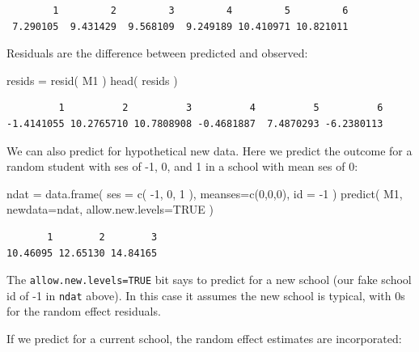 \documentclass[
  letterpaper,
  DIV=11,
  numbers=noendperiod]{scrreprt}
\newenvironment{Shaded}{\begin{snugshade}}{\end{snugshade}}
\newcommand{\AttributeTok}[1]{\textcolor[rgb]{0.49,0.56,0.16}{#1}}
\newcommand{\ConstantTok}[1]{\textcolor[rgb]{0.53,0.00,0.00}{#1}}
\newcommand{\DecValTok}[1]{\textcolor[rgb]{0.25,0.63,0.44}{#1}}
\newcommand{\FunctionTok}[1]{\textcolor[rgb]{0.02,0.16,0.49}{#1}}
\newcommand{\NormalTok}[1]{\textcolor[rgb]{0.00,0.44,0.13}{#1}}
\newcommand{\OtherTok}[1]{\textcolor[rgb]{0.00,0.44,0.13}{#1}}
\newcommand{\SpecialCharTok}[1]{\textcolor[rgb]{0.25,0.44,0.63}{#1}}
\begin{document}
\begin{verbatim}
        1         2         3         4         5         6 
 7.290105  9.431429  9.568109  9.249189 10.410971 10.821011 
\end{verbatim}

Residuals are the difference between predicted and observed:

\begin{Shaded}
\begin{Highlighting}[]
\NormalTok{resids }\OtherTok{=} \FunctionTok{resid}\NormalTok{( M1 )}
\FunctionTok{head}\NormalTok{( resids )}
\end{Highlighting}
\end{Shaded}

\begin{verbatim}
         1          2          3          4          5          6 
-1.4141055 10.2765710 10.7808908 -0.4681887  7.4870293 -6.2380113 
\end{verbatim}

We can also predict for hypothetical new data. Here we predict the
outcome for a random student with ses of -1, 0, and 1 in a school with
mean ses of 0:

\begin{Shaded}
\begin{Highlighting}[]
\NormalTok{ndat }\OtherTok{=} \FunctionTok{data.frame}\NormalTok{( }\AttributeTok{ses =} \FunctionTok{c}\NormalTok{( }\SpecialCharTok{{-}}\DecValTok{1}\NormalTok{, }\DecValTok{0}\NormalTok{, }\DecValTok{1}\NormalTok{ ), }\AttributeTok{meanses=}\FunctionTok{c}\NormalTok{(}\DecValTok{0}\NormalTok{,}\DecValTok{0}\NormalTok{,}\DecValTok{0}\NormalTok{), }\AttributeTok{id =} \SpecialCharTok{{-}}\DecValTok{1}\NormalTok{ )}
\FunctionTok{predict}\NormalTok{( M1, }\AttributeTok{newdata=}\NormalTok{ndat, }\AttributeTok{allow.new.levels=}\ConstantTok{TRUE}\NormalTok{ )}
\end{Highlighting}
\end{Shaded}

\begin{verbatim}
       1        2        3 
10.46095 12.65130 14.84165 
\end{verbatim}

The \texttt{allow.new.levels=TRUE} bit says to predict for a new school
(our fake school id of -1 in \texttt{ndat} above). In this case it
assumes the new school is typical, with 0s for the random effect
residuals.

If we predict for a current school, the random effect estimates are
incorporated:
\end{document}

